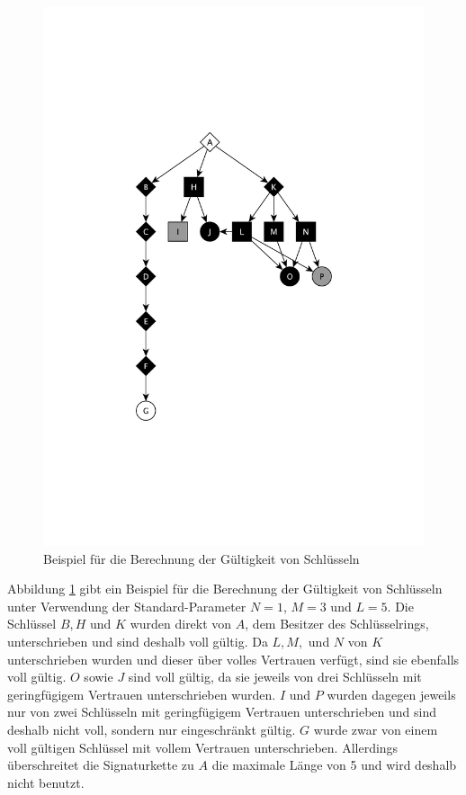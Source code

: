 \begin{figure}[t]
  \centering
  \includegraphics[scale=0.7]{images/trust-beispiel.pdf}
  \caption{Beispiel für die Berechnung der Gültigkeit von Schlüsseln}
  \label{fig:trust-beispiel}
\end{figure}

Abbildung \ref{fig:trust-beispiel} gibt ein Beispiel für die
Berechnung der Gültigkeit von Schlüsseln unter Verwendung der
Standard-Parameter $N=1$, $M=3$ und $L=5$. Die Schlüssel $B, H$ und
$K$ wurden direkt von $A$, dem Besitzer des Schlüsselrings,
unterschrieben und sind deshalb voll gültig. Da $L, M,$ und $N$ von
$K$ unterschrieben wurden und dieser über volles Vertrauen verfügt,
sind sie ebenfalls voll gültig. $O$ sowie $J$ sind voll gültig, da sie
jeweils von drei Schlüsseln mit geringfügigem Vertrauen unterschrieben
wurden. $I$ und $P$ wurden dagegen jeweils nur von zwei Schlüsseln mit
geringfügigem Vertrauen unterschrieben und sind deshalb nicht voll, 
sondern nur eingeschränkt gültig. $G$ wurde zwar von einem voll
gültigen Schlüssel mit vollem Vertrauen unterschrieben. Allerdings
überschreitet die Signaturkette zu $A$ die maximale Länge von 5 und
wird deshalb nicht benutzt.

